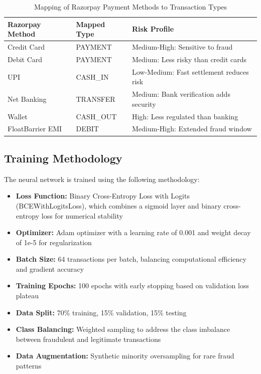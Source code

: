 \documentclass[onecolumn,a4paper,10pt]{IEEEtran}
\begin{document}
\begin{table}[!htb]
\small
\centering
\begin{tabular}{|p{3.5cm}|p{3.5cm}|p{5.5cm}|}
\hline
\cellcolor{lightblue!30}\textbf{Razorpay Method} & \cellcolor{lightblue!30}\textbf{Mapped Type} & \cellcolor{lightblue!30}\textbf{Risk Profile} \\
\hline
Credit Card & PAYMENT & Medium-High: Sensitive to fraud \\
\hline
Debit Card & PAYMENT & Medium: Less risky than credit cards \\
\hline
UPI & CASH\_IN & Low-Medium: Fast settlement reduces risk \\
\hline
Net Banking & TRANSFER & Medium: Bank verification adds security \\
\hline
Wallet & CASH\_OUT & High: Less regulated than banking \\
\hline
FloatBarrier
EMI & DEBIT & Medium-High: Extended fraud window \\
\hline
\end{tabular}
\caption{Mapping of Razorpay Payment Methods to Transaction Types}
\label{table:razorpay_mapping}
\end{table}

\subsection{Training Methodology}

The neural network is trained using the following methodology:

\begin{itemize}
    \item \textbf{Loss Function:} Binary Cross-Entropy Loss with Logits (BCEWithLogitsLoss), which combines a sigmoid layer and binary cross-entropy loss for numerical stability
    \item \textbf{Optimizer:} Adam optimizer with a learning rate of 0.001 and weight decay of 1e-5 for regularization
    \item \textbf{Batch Size:} 64 transactions per batch, balancing computational efficiency and gradient accuracy
    \item \textbf{Training Epochs:} 100 epochs with early stopping based on validation loss plateau
    \item \textbf{Data Split:} 70\% training, 15\% validation, 15\% testing
    \item \textbf{Class Balancing:} Weighted sampling to address the class imbalance between fraudulent and legitimate transactions \cite{fraud_nn}
    \item \textbf{Data Augmentation:} Synthetic minority oversampling for rare fraud patterns
\end{itemize}
\end{document}
